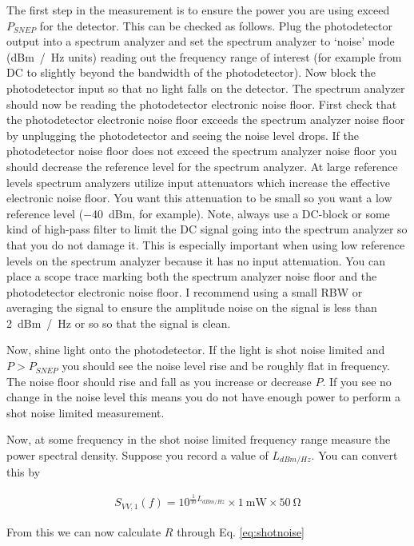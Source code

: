 \documentclass[12pt]{article}
\begin{document}
The first step in the measurement is to ensure the power you are using exceed $P_{SNEP}$ for the detector.
This can be checked as follows.
Plug the photodetector output into a spectrum analyzer and set the spectrum analyzer to `noise' mode (\si{dBm / \Hz} units) reading out the frequency range of interest (for example from DC to slightly beyond the bandwidth of the photodetector).
Now block the photodetector input so that no light falls on the detector.
The spectrum analyzer should now be reading the photodetector electronic noise floor.
First check that the photodetector electronic noise floor exceeds the spectrum analyzer noise floor by unplugging the photodetector and seeing the noise level drops.
If the photodetector noise floor does not exceed the spectrum analyzer noise floor you should decrease the reference level for the spectrum analyzer.
At large reference levels spectrum analyzers utilize input attenuators which increase the effective electronic noise floor.
You want this attenuation to be small so you want a low reference level (\SI{-40}{dBm}, for example).
Note, always use a DC-block or some kind of high-pass filter to limit the DC signal going into the spectrum analyzer so that you do not damage it.
This is especially important when using low reference levels on the spectrum analyzer because it has no input attenuation.
You can place a scope trace marking both the spectrum analyzer noise floor and the photodetector electronic noise floor.
I recommend using a small RBW or averaging the signal to ensure the amplitude noise on the signal is less than \SI{2}{dBm / \Hz} or so so that the signal is clean.

Now, shine light onto the photodetector.
If the light is shot noise limited and $P > P_{SNEP}$ you should see the noise level rise and be roughly flat in frequency.
The noise floor should rise and fall as you increase or decrease $P$.
If you see no change in the noise level this means you do not have enough power to perform a shot noise limited measurement.

Now, at some frequency in the shot noise limited frequency range measure the power spectral density.
Suppose you record a value of $L_{dBm/Hz}$.
You can convert this by

\begin{align}
S_{VV,1}(f) = 10^{\frac{1}{10} L_{dBm/Hz}}\times \SI{1}{\milli \watt} \times \SI{50}{\ohm}
\end{align}

From this we can now calculate $R$ through Eq. \ref{eq:shotnoise}
\end{document}
